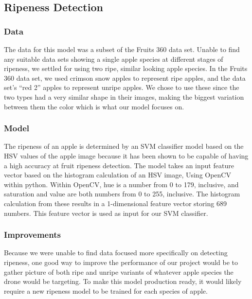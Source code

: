 \subsection{Ripeness Detection}
\subsubsection{Data}
The data for this model was a subset of the Fruits 360 data set\cite{Fruit360}.
Unable to find any suitable data sets showing a single apple species at different stages of ripeness, we settled for using two ripe, similar looking apple species.
In the Fruits 360 data set\cite{Fruit360}, we used crimson snow apples to represent ripe apples, and the data set's ``red 2'' apples to represent unripe apples. We  chose to use these since the two types had a very similar shape in their images, making the biggest variation between them the color which is what our model focuses on.

\subsubsection{Model}
The ripeness of an apple is determined by an SVM classifier model based on the HSV values of the apple image because it has been shown to be capable of having a high accuracy at fruit ripeness detection\cite{HSVRipeness}.
The model takes an input feature vector based on the histogram calculation of an HSV image, Using OpenCV within python.
Within OpenCV, hue is a number from 0 to 179, inclusive, and saturation and value are both numbers from 0 to 255, inclusive.
The histogram calculation from these results in a 1-dimensional feature vector storing 689 numbers. 
This feature vector is used as input for our SVM classifier.

\subsubsection{Improvements}
Because we were unable to find data focused more specifically on detecting ripeness, 
one good way to improve the performance of our project would be to gather picture of both ripe and unripe variants of whatever apple species the drone would be targeting. 
To make this model production ready, it would likely require a new ripeness model to be trained for each species of apple.

